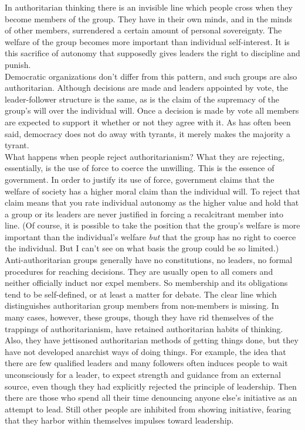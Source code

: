 \documentclass[12pt, onecolumn, letterpaper, oneside]{book}
\begin{document}
In authoritarian thinking there is an invisible line which people cross when they become members of the group. They have in their own minds, and in the minds of other members, surrendered a certain amount of personal sovereignty. The welfare of the group becomes more important than individual self-interest. It is this sacrifice of autonomy that supposedly gives leaders the right to discipline and punish.\\
Democratic organizations don't differ from this pattern, and such groups are also authoritarian. Although decisions are made and leaders appointed by vote, the leader-follower structure is the same, as is the claim of the supremacy of the group's will over the individual will. Once a decision is made by vote all members are expected to support it whether or not they agree with it. As has often been said, democracy does not do away with tyrants, it merely makes the majority a tyrant.\\
What happens when people reject authoritarianism? What they are rejecting, essentially, is the use of force to coerce the unwilling. This is the essence of government. In order to justify its use of force, government claims that the welfare of society has a higher moral claim than the individual will. To reject that claim means that you rate individual autonomy as the higher value and hold that a group or its leaders are never justified in forcing a recalcitrant member into line. (Of course, it is possible to take the position that the group's welfare is more important than the individual's welfare \emph{but} that the group has no right to coerce the individual. But I can't see on what basis the group could be so limited.)\\
Anti-authoritarian groups generally have no constitutions, no leaders, no formal procedures for reaching decisions. They are usually open to all comers and neither officially induct nor expel members. So membership and its obligations tend to be self-defined, or at least a matter for debate. The clear line which distinguishes authoritarian group members from non-members is missing. In many cases, however, these groups, though they have rid themselves of the trappings of authoritarianism, have retained authoritarian habits of thinking. Also, they have jettisoned authoritarian methods of getting things done, but they have not developed anarchist ways of doing things. For example, the idea that there are few qualified leaders and many followers often induces people to wait unconsciously for a leader, to expect strength and guidance from an external source, even though they had explicitly rejected the principle of leadership. Then there are those who spend all their time denouncing anyone else's initiative as an attempt to lead. Still other people are inhibited from showing initiative, fearing that they harbor within themselves impulses toward leadership.\\
\end{document}
